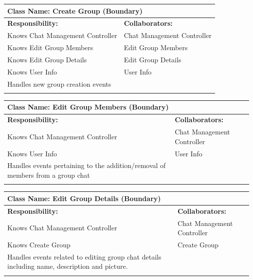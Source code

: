 \documentclass[]{article}
\begin{document}
\begin{itemize}
  	\begin{table}[ht]
		\centering
		\begin{tabular}{|p{7cm}|p{7cm}|}
		\hline 
		\multicolumn{2}{|l|}{\textbf{Class Name:} Create Group (Boundary)} \\
		\hline
		\textbf{Responsibility:} & \textbf{Collaborators:} \\
		\hline
  			Knows Chat Management Controller & Chat Management Controller \\
			Knows Edit Group Members & Edit Group Members \\
			Knows Edit Group Details & Edit Group Details \\
			Knows User Info & User Info \\
			Handles new group creation events &\\
		\vspace{1in} & \\
		\hline
		\end{tabular}
	\end{table}

   	\begin{table}[ht]
		\centering
		\begin{tabular}{|p{7cm}|p{7cm}|}
		\hline 
		\multicolumn{2}{|l|}{\textbf{Class Name:} Edit Group Members (Boundary)} \\
		\hline
		\textbf{Responsibility:} & \textbf{Collaborators:} \\
		\hline
  			Knows Chat Management Controller & Chat Management Controller \\
			Knows User Info & User Info \\
			Handles events pertaining to the addition/removal of members from a group chat &\\
		\vspace{1in} & \\
		\hline
		\end{tabular}
	\end{table}

   	\begin{table}[ht]
		\centering
		\begin{tabular}{|p{7cm}|p{7cm}|}
		\hline 
		\multicolumn{2}{|l|}{\textbf{Class Name:} Edit Group Details (Boundary)} \\
		\hline
		\textbf{Responsibility:} & \textbf{Collaborators:} \\
		\hline
  			Knows Chat Management Controller & Chat Management Controller \\
			Knows Create Group & Create Group \\
			Handles events related to editing group chat details including name, description and picture. &\\
		\vspace{1in} & \\
		\hline
		\end{tabular}
	\end{table}


\end{itemize}
\end{document}
